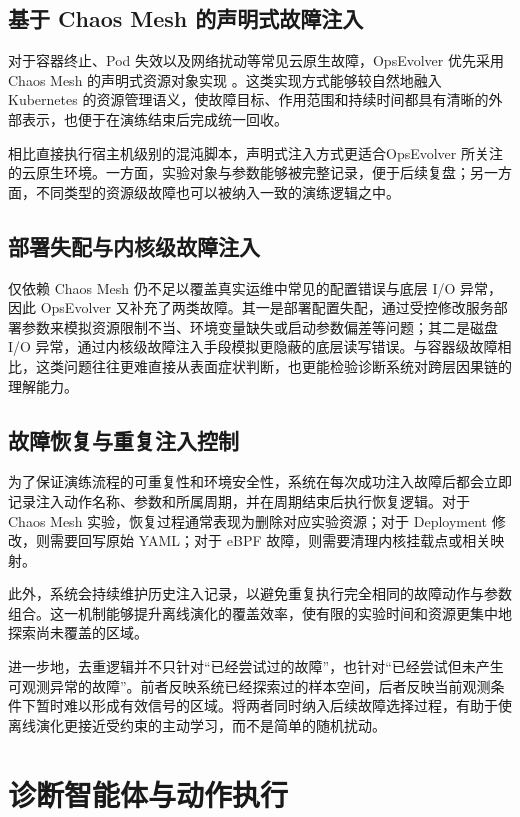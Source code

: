 \subsection{基于 Chaos Mesh 的声明式故障注入}

对于容器终止、Pod 失效以及网络扰动等常见云原生故障，OpsEvolver 优先采用 Chaos Mesh 的声明式资源对象实现 \cite{chaosmesh}。这类实现方式能够较自然地融入 Kubernetes 的资源管理语义，使故障目标、作用范围和持续时间都具有清晰的外部表示，也便于在演练结束后完成统一回收。

相比直接执行宿主机级别的混沌脚本，声明式注入方式更适合OpsEvolver 所关注的云原生环境。一方面，实验对象与参数能够被完整记录，便于后续复盘；另一方面，不同类型的资源级故障也可以被纳入一致的演练逻辑之中。

\subsection{部署失配与内核级故障注入}

仅依赖 Chaos Mesh 仍不足以覆盖真实运维中常见的配置错误与底层 I/O 异常，因此 OpsEvolver 又补充了两类故障。其一是部署配置失配，通过受控修改服务部署参数来模拟资源限制不当、环境变量缺失或启动参数偏差等问题；其二是磁盘 I/O 异常，通过内核级故障注入手段模拟更隐蔽的底层读写错误。与容器级故障相比，这类问题往往更难直接从表面症状判断，也更能检验诊断系统对跨层因果链的理解能力。

\subsection{故障恢复与重复注入控制}

为了保证演练流程的可重复性和环境安全性，系统在每次成功注入故障后都会立即记录注入动作名称、参数和所属周期，并在周期结束后执行恢复逻辑。对于 Chaos Mesh 实验，恢复过程通常表现为删除对应实验资源；对于 Deployment 修改，则需要回写原始 YAML；对于 eBPF 故障，则需要清理内核挂载点或相关映射。

此外，系统会持续维护历史注入记录，以避免重复执行完全相同的故障动作与参数组合。这一机制能够提升离线演化的覆盖效率，使有限的实验时间和资源更集中地探索尚未覆盖的区域。

进一步地，去重逻辑并不只针对“已经尝试过的故障”，也针对“已经尝试但未产生可观测异常的故障”。前者反映系统已经探索过的样本空间，后者反映当前观测条件下暂时难以形成有效信号的区域。将两者同时纳入后续故障选择过程，有助于使离线演化更接近受约束的主动学习，而不是简单的随机扰动。

\section{诊断智能体与动作执行}
\label{sec:diagnoser_impl}


